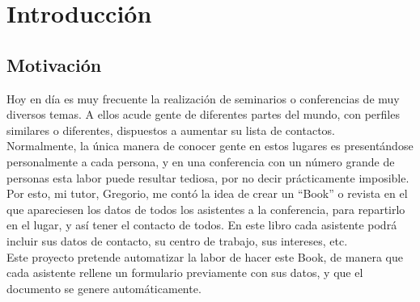 \documentclass[a4paper, 12pt]{book}
\begin{document}

\cleardoublepage
\chapter{Introducción}
\label{chap:intro} %

\section{Motivación}
\label{sec:motivacion}
Hoy en día es muy frecuente la realización de seminarios o conferencias de muy diversos temas. A ellos acude gente de diferentes partes del mundo, con perfiles similares o diferentes, dispuestos a aumentar su lista de contactos. \\

Normalmente, la única manera de conocer gente en estos lugares es presentándose personalmente a cada persona, y en una conferencia con un número grande de personas esta labor puede resultar tediosa, por no decir prácticamente imposible.\\

Por esto, mi tutor, Gregorio, me contó la idea de crear un ``Book'' o revista en el que apareciesen los datos de todos los asistentes a la conferencia, para repartirlo en el lugar, y así tener el contacto de todos. En este libro cada asistente podrá incluir sus datos de contacto, su centro de trabajo, sus intereses, etc.\\

Este proyecto pretende automatizar la labor de hacer este Book, de manera que cada asistente rellene un formulario previamente con sus datos, y que el documento se genere automáticamente.
\end{document}
